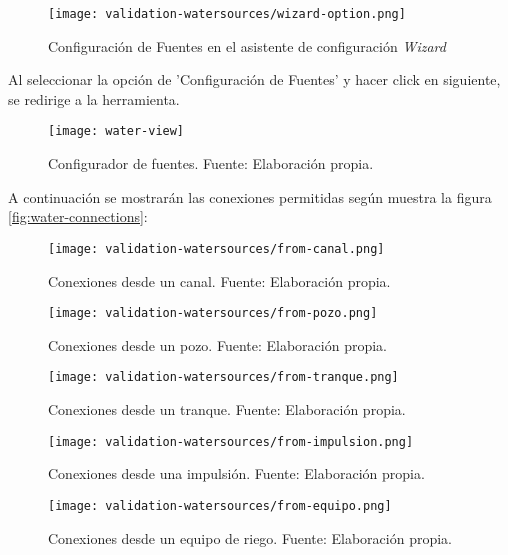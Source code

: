 \begin{figure}[H]
	\centering
	\texttt{[image: validation-watersources/wizard-option.png]}
	\caption{\label{fig:ws-wizard-option} Configuración de Fuentes en el asistente de configuración \textit{Wizard}}
\end{figure}

Al seleccionar la opción de 'Configuración de Fuentes' y hacer click en siguiente, se redirige a la herramienta.

\begin{figure}[H]
	\centering
	\texttt{[image: water-view]}
	\caption{\label{fig:water-view} Configurador de fuentes. Fuente: Elaboración propia.}
\end{figure}

A continuación se mostrarán las conexiones permitidas según muestra la figura \ref{fig:water-connections}:

\begin{figure}[H]
	\centering
	\texttt{[image: validation-watersources/from-canal.png]}
	\caption{\label{fig:from-canal} Conexiones desde un canal. Fuente: Elaboración propia.}
\end{figure}

\begin{figure}[H]
	\centering
	\texttt{[image: validation-watersources/from-pozo.png]}
	\caption{\label{fig:from-pozo} Conexiones desde un pozo. Fuente: Elaboración propia.}
\end{figure}

\begin{figure}[H]
	\centering
	\texttt{[image: validation-watersources/from-tranque.png]}
	\caption{\label{fig:from-tranque} Conexiones desde un tranque. Fuente: Elaboración propia.}
\end{figure}

\begin{figure}[H]
	\centering
	\texttt{[image: validation-watersources/from-impulsion.png]}
	\caption{\label{fig:from-impulsion} Conexiones desde una impulsión. Fuente: Elaboración propia.}
\end{figure}

\begin{figure}[H]
	\centering
	\texttt{[image: validation-watersources/from-equipo.png]}
	\caption{\label{fig:from-equipo} Conexiones desde un equipo de riego. Fuente: Elaboración propia.}
\end{figure}